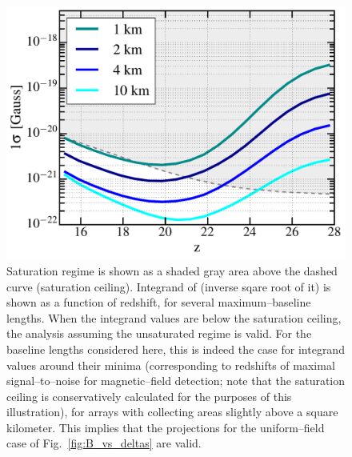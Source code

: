 \begin{figure}
\centering
\includegraphics[width=.4\textwidth,keepaspectratio=true]{sigmaB0_vs_z.pdf}
\caption{Saturation regime is shown as a shaded gray area above the dashed curve (saturation ceiling). Integrand of \eq{\ref{eq:fisher_patch}} (inverse sqare root of it) is shown as a function of redshift, for several maximum--baseline lengths.  When the integrand values are below the saturation ceiling, the analysis assuming the unsaturated regime is valid. For the baseline lengths considered here, this is indeed the case for integrand values around their minima (corresponding to redshifts of maximal signal--to--noise for magnetic--field detection; note that the saturation ceiling is conservatively calculated for the purposes of this illustration), for arrays with collecting areas slightly above a square kilometer. This implies that the projections for the uniform--field case of Fig.~\ref{fig:B_vs_deltas} are valid. \label{fig:Bsat}}
\end{figure}
